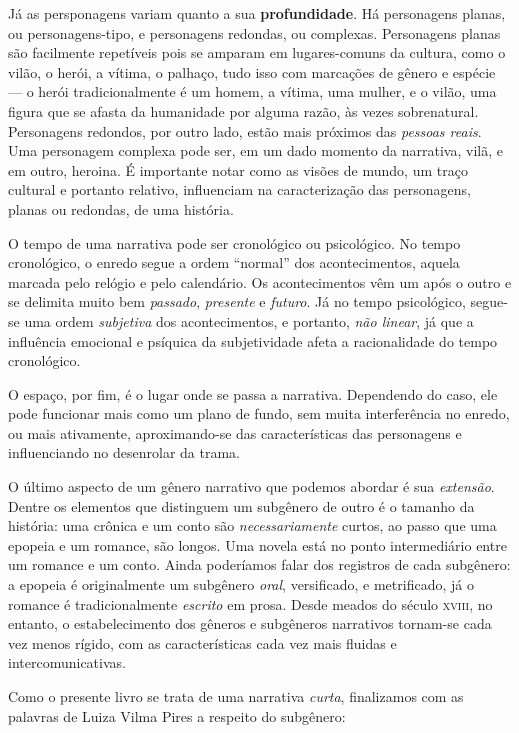 \documentclass[11pt]{extarticle}
\begin{document}
Já as persponagens variam quanto a sua \textbf{profundidade}. Há personagens planas, ou
personagens-tipo, e personagens redondas, ou complexas. Personagens planas
são facilmente repetíveis pois se amparam em lugares-comuns da cultura, como
o vilão, o herói, a vítima, o palhaço, tudo isso com marcações de gênero e espécie ---
o herói tradicionalmente é um homem, a vítima, uma mulher, e o vilão, uma figura que 
se afasta da humanidade por alguma razão, às vezes sobrenatural. 
Personagens redondos, por outro lado, estão mais próximos das \textit{pessoas reais}.
Uma personagem complexa pode ser, em um dado momento da narrativa, vilã, e em 
outro, heroina. É importante notar como as visões de mundo, um traço cultural e 
portanto relativo, influenciam na caracterização das personagens, planas 
ou redondas, de uma história.

O tempo de uma narrativa pode ser cronológico ou psicológico.
No tempo cronológico, o enredo segue a ordem ``normal'' dos acontecimentos,
aquela marcada pelo relógio e pelo calendário. Os acontecimentos vêm um após o 
outro e se delimita muito bem \textit{passado}, \textit{presente} e \textit{futuro}.
Já no tempo psicológico, segue-se uma ordem \textit{subjetiva} dos acontecimentos, 
e portanto, \textit{não linear}, já que a influência emocional e psíquica 
da subjetividade afeta a racionalidade do tempo cronológico. 

O espaço, por fim, é o lugar onde se passa a narrativa. Dependendo do caso, 
ele pode funcionar mais como um plano de fundo, sem muita interferência
no enredo, ou mais ativamente, aproximando-se das características das personagens
e influenciando no desenrolar da trama. 

O último aspecto de um gênero narrativo que podemos abordar é sua 
\textit{extensão}. Dentre os elementos que distinguem um subgênero 
de outro é o tamanho da história: uma crônica e um conto são \textit{necessariamente}
curtos, ao passo que uma epopeia e um romance, são longos. Uma novela
está no ponto intermediário entre um romance e um conto.
Ainda poderíamos falar dos registros de cada subgênero: 
a epopeia é originalmente um subgênero \textit{oral}, versificado, e metrificado,
já o romance é tradicionalmente \textit{escrito} em prosa. 
Desde meados do século \textsc{xviii}, no entanto, o estabelecimento
dos gêneros e subgêneros narrativos tornam-se cada vez menos rígido,
com as características cada vez mais fluidas e intercomunicativas.

Como o presente livro se trata de uma narrativa \textit{curta},
finalizamos com as palavras de Luiza Vilma Pires a respeito do
subgênero:
\end{document}
